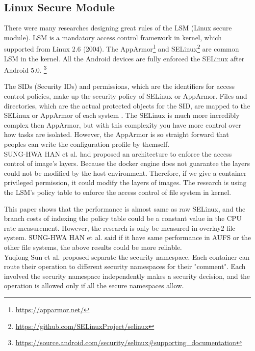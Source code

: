 \subsection{Linux Secure Module}
There were many researches designing great rules of the LSM (Linux secure module). LSM is a
mandatory access control framework in kernel, which supported from Linux 2.6 (2004). The
AppArmor\footnote{\url{https://apparmor.net/}} and SELinux\footnote{\url{https://github.com/SELinuxProject/selinux}}
are common LSM in the kernel. All the
Android devices are fully enforced the SELinux after Android 5.0.
\footnote{\url{https://source.android.com/security/selinux\#supporting\_documentation}}

The SIDs (Security IDs) and permissions, which are the identifiers for access control policies,
make up the security policy of SELinux or AppArmor. Files and directories, which are the actual protected
objects for the SID, are mapped to the SELinux or AppArmor of each system \cite{Smalley2003ImplementingSA,x11-SELinux,quteprints30563}.
The SELinux is much more incredibly complex then AppArmor, but with this complexity you have more
control over how tasks are isolated. However, the AppArmor is so straight forward that peoples can
write the configuration profile by themself. \\

SUNG-HWA HAN et al.\cite{9184912} had proposed an architecture to enforce the access
control of image's layers. Because the docker engine does not guarantee the layers could
not be modified by the host environment. Therefore, if we give a container privileged
permission, it could modify the layers of images. The research \cite{9184912} is using
the LSM's policy table to enforce the access control of file system in kernel.

This paper \cite{9184912} shows that the performance is almost same as raw SELinux,
and the branch costs of indexing the policy table could be a constant value in the
CPU rate measurement. However, the research is only be measured in overlay2 file system.
SUNG-HWA HAN et al. said if it have same performance in AUFS or the other file systems,
the above results could be more reliable. \\

Yuqiong Sun et al.\cite{217614} proposed separate the security namespace. Each container
can route their operation to different security namespaces for their "comment". Each
involved the security namespace independently makes a security decision, and the
operation is allowed only if all the secure namespaces allow.


